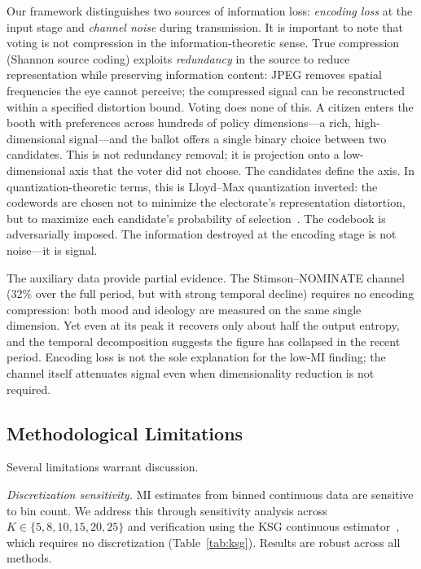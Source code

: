 \documentclass[twocolumn,10pt]{article}
\begin{document}
Our framework distinguishes two sources of information loss: \emph{encoding loss} at the input stage and \emph{channel noise} during transmission.  It is important to note that voting is not compression in the information-theoretic sense.  True compression (Shannon source coding) exploits \emph{redundancy} in the source to reduce representation while preserving information content: JPEG removes spatial frequencies the eye cannot perceive; the compressed signal can be reconstructed within a specified distortion bound.  Voting does none of this.  A citizen enters the booth with preferences across hundreds of policy dimensions---a rich, high-dimensional signal---and the ballot offers a single binary choice between two candidates.  This is not redundancy removal; it is projection onto a low-dimensional axis that the voter did not choose.  The candidates define the axis.  In quantization-theoretic terms, this is Lloyd--Max quantization inverted: the codewords are chosen not to minimize the electorate's representation distortion, but to maximize each candidate's probability of selection~\citep{cover2006}.  The codebook is adversarially imposed.  The information destroyed at the encoding stage is not noise---it is signal.

The auxiliary data provide partial evidence.  The Stimson--NOMINATE channel (32\% over the full period, but with strong temporal decline) requires no encoding compression: both mood and ideology are measured on the same single dimension.  Yet even at its peak it recovers only about half the output entropy, and the temporal decomposition suggests the figure has collapsed in the recent period.  Encoding loss is not the sole explanation for the low-MI finding; the channel itself attenuates signal even when dimensionality reduction is not required.

\subsection{Methodological Limitations}
\label{sec:limitations}

Several limitations warrant discussion.

\emph{Discretization sensitivity.}  MI estimates from binned continuous data are sensitive to bin count.  We address this through sensitivity analysis across $K \in \{5, 8, 10, 15, 20, 25\}$ and verification using the KSG continuous estimator~\citep{kraskov2004}, which requires no discretization (Table~\ref{tab:ksg}).  Results are robust across all methods.
\end{document}
